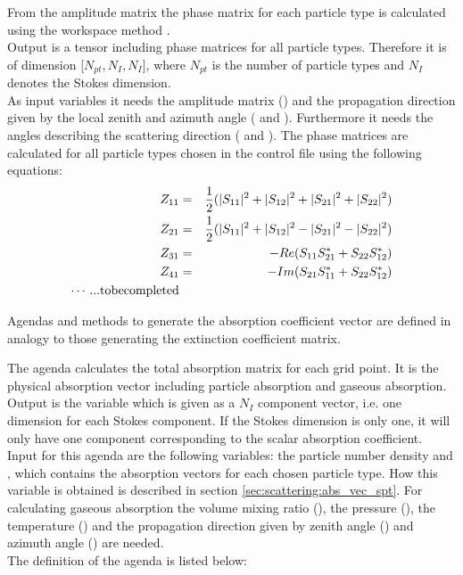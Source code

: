 From the amplitude matrix the phase matrix for each
particle type is calculated using the workspace method
.\\
Output is a tensor including phase matrices for all particle
types. Therefore it is  of  dimension
[$N_{pt}, N_{I}, N_{I}$], where $N_{pt}$ is the number of particle
types  and $N_{I}$ denotes the Stokes dimension.\\
As input variables it needs the amplitude matrix ()
and the propagation direction given by the local zenith and azimuth
angle ( and ). Furthermore it needs the
angles describing the scattering direction  ( and
). 
The phase matrices \PhaMat{} are
calculated for all particle types chosen in the control
file using the following equations: 
\begin{eqnarray}
   Z_{11} &=& \frac{1}{2}(|S_{11}|^2+|S_{12}|^2+|S_{21}|^2+|S_{22}|^2)\\
   Z_{21} &=& \frac{1}{2}(|S_{11}|^2+|S_{12}|^2-|S_{21}|^2-|S_{22}|^2)\\
   Z_{31} &=& -Re(S_{11}S_{21}^*+S_{22}S_{12}^*)\\
   Z_{41} &=& -Im(S_{21}S_{11}^*+S_{22}S_{12}^*)\\
\cdots ... {\rm to be completed}
\end{eqnarray}






\label{sec:scattering:abs_vec}

Agendas and methods to generate the absorption coefficient vector are
defined in analogy to those generating the extinction coefficient matrix.

\label{sec:scattering:abs_vec_agenda}

The agenda  calculates the total absorption
matrix \AbsVec{}
for each grid point. It is the physical absorption vector including
particle absorption and gaseous absorption.\\
Output is the variable  which is given
as a $N_I$ component vector, i.e. one dimension for each Stokes component. If the
Stokes dimension is only one, it will only have one component
corresponding to the scalar absorption coefficient. \\
Input for this agenda are the following variables:
the particle number density  and 
, which contains the absorption vectors  for
each chosen particle type. How this variable is obtained
is described in section \ref{sec:scattering:abs_vec_spt}. For calculating 
gaseous absorption the volume mixing ratio (), the
pressure  (), the temperature  () and the
propagation direction given by zenith angle () and
azimuth angle () are needed.\\
The definition of the agenda is listed below:

